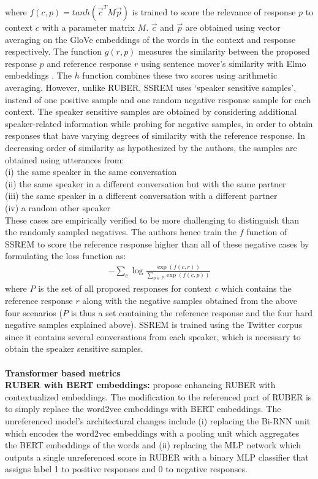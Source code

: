where $f(c,p) = tanh(\overrightarrow{c}^TM\overrightarrow{p})$ is trained to score the relevance of response $p$ to context $c$ with a parameter matrix $M$. $\overrightarrow{c}$ and $\overrightarrow{p}$ are obtained using vector averaging on the GloVe embeddings  of the words in the context and response respectively. The function $g(r,p)$ measures the similarity between the proposed response $p$ and reference response $r$ using sentence mover's similarity  with Elmo embeddings . The $h$ function combines these two scores using arithmetic averaging.
However, unlike RUBER, SSREM uses `speaker sensitive samples', instead of one positive sample and one random negative response sample for each context. The speaker sensitive samples are obtained by considering additional speaker-related information while probing for negative samples, in order to obtain responses that have varying degrees of similarity with the reference response. In decreasing order of similarity as hypothesized by the authors, the samples are obtained using utterances from:\\ (i) the same speaker in the same conversation\\  (ii) the same speaker in a different conversation but with the same partner\\
(iii) the same speaker in a different conversation with a different partner\\
(iv) a random other speaker\\
These cases are empirically verified to be more challenging to distinguish than the randomly sampled negatives. The authors hence train the $f$ function of SSREM to score the reference response higher than all of these negative cases by formulating the loss function as:
\begin{align*}
    -\sum_{c}\log\frac{\exp (f(c,r))}{\sum_{p \in P} \exp(f(c,p))}
\end{align*}
where $P$ is the set of all proposed responses for context $c$ which contains the reference response $r$ along with the negative samples obtained from the above four scenarios ($P$ is thus a set containing the reference response and the four hard negative samples explained above). SSREM is trained using the Twitter corpus since it contains several conversations from each speaker, which is necessary to obtain the speaker sensitive samples. \\
\\
\textbf{Transformer based metrics}\\
\textbf{RUBER with BERT embeddings:}  propose enhancing RUBER with contextualized embeddings. The modification to the referenced part of RUBER is to simply replace the word2vec embeddings with BERT embeddings. The unreferenced model's architectural changes include (i) replacing the Bi-RNN unit which encodes the word2vec embeddings with a pooling unit which aggregates the BERT embeddings of the words and (ii) replacing the MLP network which outputs a single unreferenced score in RUBER with a binary MLP classifier that assigns label 1 to positive responses and 0 to negative responses.

